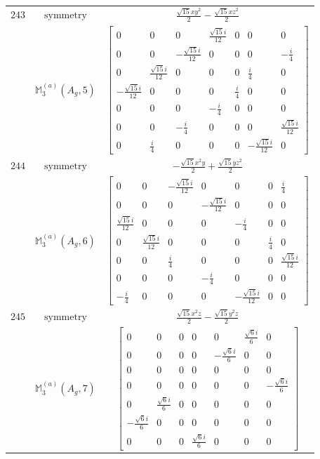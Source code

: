 \documentclass[fleqn,8pt,landscape]{jsarticle}
\begin{document}
\begin{longtable}{ccc}
$ 243 $ & $ \text{symmetry} $ & $ \frac{\sqrt{15} x y^{2}}{2} - \frac{\sqrt{15} x z^{2}}{2} $ \\
$  $ & $ \mathbb{M}_{3}^{(a)}(A_{g},5) $ & $ \begin{bmatrix} 0 & 0 & 0 & \frac{\sqrt{15} i}{12} & 0 & 0 & 0 \\ 0 & 0 & - \frac{\sqrt{15} i}{12} & 0 & 0 & 0 & - \frac{i}{4} \\ 0 & \frac{\sqrt{15} i}{12} & 0 & 0 & 0 & \frac{i}{4} & 0 \\ - \frac{\sqrt{15} i}{12} & 0 & 0 & 0 & \frac{i}{4} & 0 & 0 \\ 0 & 0 & 0 & - \frac{i}{4} & 0 & 0 & 0 \\ 0 & 0 & - \frac{i}{4} & 0 & 0 & 0 & \frac{\sqrt{15} i}{12} \\ 0 & \frac{i}{4} & 0 & 0 & 0 & - \frac{\sqrt{15} i}{12} & 0 \end{bmatrix} $ \\ \hline
$ 244 $ & $ \text{symmetry} $ & $ - \frac{\sqrt{15} x^{2} y}{2} + \frac{\sqrt{15} y z^{2}}{2} $ \\
$  $ & $ \mathbb{M}_{3}^{(a)}(A_{g},6) $ & $ \begin{bmatrix} 0 & 0 & - \frac{\sqrt{15} i}{12} & 0 & 0 & 0 & \frac{i}{4} \\ 0 & 0 & 0 & - \frac{\sqrt{15} i}{12} & 0 & 0 & 0 \\ \frac{\sqrt{15} i}{12} & 0 & 0 & 0 & - \frac{i}{4} & 0 & 0 \\ 0 & \frac{\sqrt{15} i}{12} & 0 & 0 & 0 & \frac{i}{4} & 0 \\ 0 & 0 & \frac{i}{4} & 0 & 0 & 0 & \frac{\sqrt{15} i}{12} \\ 0 & 0 & 0 & - \frac{i}{4} & 0 & 0 & 0 \\ - \frac{i}{4} & 0 & 0 & 0 & - \frac{\sqrt{15} i}{12} & 0 & 0 \end{bmatrix} $ \\ \hline
$ 245 $ & $ \text{symmetry} $ & $ \frac{\sqrt{15} x^{2} z}{2} - \frac{\sqrt{15} y^{2} z}{2} $ \\
$  $ & $ \mathbb{M}_{3}^{(a)}(A_{g},7) $ & $ \begin{bmatrix} 0 & 0 & 0 & 0 & 0 & \frac{\sqrt{6} i}{6} & 0 \\ 0 & 0 & 0 & 0 & - \frac{\sqrt{6} i}{6} & 0 & 0 \\ 0 & 0 & 0 & 0 & 0 & 0 & 0 \\ 0 & 0 & 0 & 0 & 0 & 0 & - \frac{\sqrt{6} i}{6} \\ 0 & \frac{\sqrt{6} i}{6} & 0 & 0 & 0 & 0 & 0 \\ - \frac{\sqrt{6} i}{6} & 0 & 0 & 0 & 0 & 0 & 0 \\ 0 & 0 & 0 & \frac{\sqrt{6} i}{6} & 0 & 0 & 0 \end{bmatrix} $ \\ \hline

\end{longtable}
\end{document}
